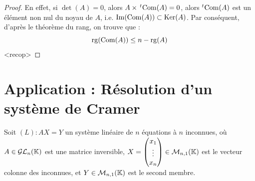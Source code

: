 \documentclass[12pt, a4paper]{report}
\begin{document}
\begin{proof}
    En effet, si $\det(A) = 0$, alors $A\times \,^t\mathrm{Com}(A) = 0$, alors $^t\mathrm{Com}(A)$ est un élément non nul du noyau de $A$, i.e. $\mathrm{Im}(\mathrm{Com}(A)) \subset \mathrm{Ker}(A)$. Par conséquent, d'après le théorème du rang, on trouve que :
    $$\mathrm{rg}(\mathrm{Com}(A)) \le n - \mathrm{rg}(A)$$
    <recop>
\end{proof}

\section{Application : Résolution d'un système de Cramer}

Soit $(L) : AX = Y$ un système linéaire de $n$ équations à $n$ inconnues, où $A \in \mathcal{GL}_n(\mathbb{K})$ est une matrice inversible, $X = \left(\begin{matrix} x_1 \\ \vdots \\ x_n \end{matrix}\right) \in \mathcal{M}_{n,1}(\mathbb{K})$ est le vecteur colonne des inconnues, et $Y \in \mathcal{M}_{n,1}(\mathbb{K})$ est le second membre.
\end{document}
